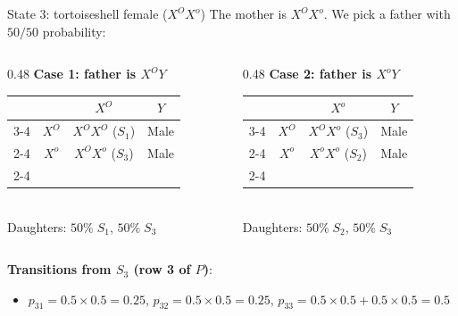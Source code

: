 \documentclass[aspectratio=169]{beamer}\usepackage[]{graphicx}\usepackage[]{xcolor}
\begin{document}
\begin{frame}{State 3: tortoiseshell female ($X^O X^o$)}
The mother is $X^O X^o$. We pick a father with $50/50$ probability:
\vfill
\begin{columns}[c]
\begin{column}{0.48\textwidth}
\centering
\textbf{Case 1: father is $X^O Y$}\\[0.1cm]
\renewcommand{\arraystretch}{1.25}
\begin{tabular}{c c | c | c |}
\multicolumn{2}{c}{} & \multicolumn{1}{c}{$X^O$} & \multicolumn{1}{c}{$Y$} \\ \cline{3-4}
\multirow{2}{*}{\rotatebox{90}{\footnotesize Mother}} & $X^O$ & \cellcolor{punnettorange}$X^O X^O$ ($S_1$) & \cellcolor{punnettorange}Male \\ \cline{2-4}
& $X^o$ & \cellcolor{punnetttortie}$X^O X^o$ ($S_3$) & \cellcolor{punnettblack}Male \\ \cline{2-4}
\end{tabular}
\\[0.1cm]
Daughters: $50\%\; S_1$, $50\%\; S_3$
\end{column}
\begin{column}{0.48\textwidth}
\centering
\textbf{Case 2: father is $X^o Y$}\\[0.1cm]
\renewcommand{\arraystretch}{1.25}
\begin{tabular}{c c | c | c |}
\multicolumn{2}{c}{} & \multicolumn{1}{c}{$X^o$} & \multicolumn{1}{c}{$Y$} \\ \cline{3-4}
\multirow{2}{*}{\rotatebox{90}{\footnotesize Mother}} & $X^O$ & \cellcolor{punnetttortie}$X^O X^o$ ($S_3$) & \cellcolor{punnettorange}Male \\ \cline{2-4}
& $X^o$ & \cellcolor{punnettblack}$X^o X^o$ ($S_2$) & \cellcolor{punnettblack}Male \\ \cline{2-4}
\end{tabular}
\\[0.1cm]
Daughters: $50\%\; S_2$, $50\%\; S_3$
\end{column}
\end{columns}
\vfill
\textbf{Transitions from $S_3$ (row 3 of $P$)}:
\begin{itemize}
\item $p_{31} = 0.5 \times 0.5 = \mathbf{0.25}$, \quad $p_{32} = 0.5 \times 0.5 = \mathbf{0.25}$, \quad $p_{33} = 0.5 \times 0.5 + 0.5 \times 0.5 = \mathbf{0.5}$
\end{itemize}
\end{frame}
\end{document}

